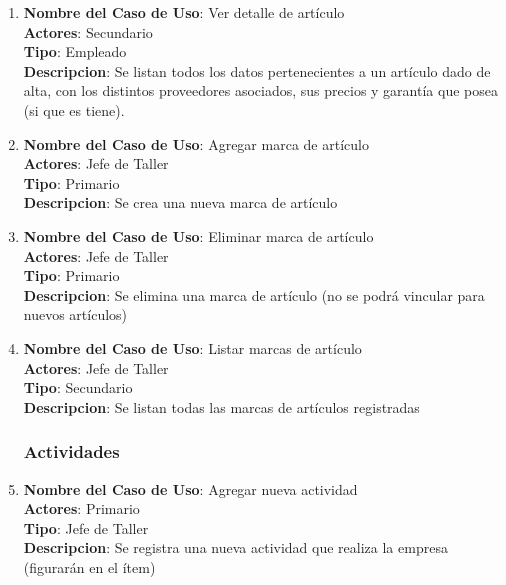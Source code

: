 \documentclass[12pt]{extarticle}
\begin{document}
\begin{spacing}{1.2}
\begin{enumerate}
            \item 	\textbf{Nombre del Caso de Uso}: Ver detalle de artículo\\
                    \textbf{Actores}: Secundario\\
                    \textbf{Tipo}: Empleado\\
                    \textbf{Descripcion}: Se listan todos los datos pertenecientes a un artículo dado de alta, con los distintos proveedores asociados, sus precios y garantía que posea (si que es tiene).

            \item 	\textbf{Nombre del Caso de Uso}: Agregar marca de artículo\\
                    \textbf{Actores}: Jefe de Taller\\
                    \textbf{Tipo}: Primario\\
                    \textbf{Descripcion}: Se crea una nueva marca de artículo

            \item 	\textbf{Nombre del Caso de Uso}: Eliminar marca de artículo\\
                    \textbf{Actores}: Jefe de Taller\\
                    \textbf{Tipo}: Primario\\
                    \textbf{Descripcion}: Se elimina una marca de artículo (no se podrá vincular para nuevos artículos)

            \item 	\textbf{Nombre del Caso de Uso}: Listar marcas de artículo\\
                    \textbf{Actores}: Jefe de Taller\\
                    \textbf{Tipo}: Secundario\\
                    \textbf{Descripcion}: Se listan todas las marcas de artículos registradas	



            \subsubsection{Actividades}



            \item 	\textbf{Nombre del Caso de Uso}: Agregar nueva actividad\\
                    \textbf{Actores}: Primario\\
                    \textbf{Tipo}: Jefe de Taller\\
                    \textbf{Descripcion}: Se registra una nueva actividad que realiza la empresa (figurarán en el ítem)


\end{enumerate}
\end{spacing}
\end{document}
